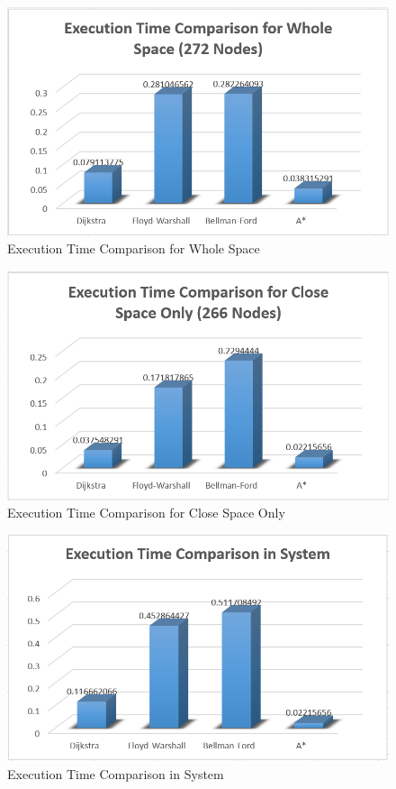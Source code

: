 \begin{figure}[h!]
	\centering
	\includegraphics[scale=0.4]{graf1.PNG}
	\caption{Execution Time Comparison for Whole Space}
	\label{fig:graf1}
\end{figure}

\begin{figure}[h!]
	\centering
	\includegraphics[scale=0.4]{graf2.PNG}
	\caption{Execution Time Comparison for Close Space Only}
	\label{fig:graf2}
\end{figure}

\begin{figure}[h!]
	\centering
	\includegraphics[scale=0.4]{graf3.PNG}
	\caption{Execution Time Comparison in System
	}
	\label{fig:graf3}
\end{figure}

